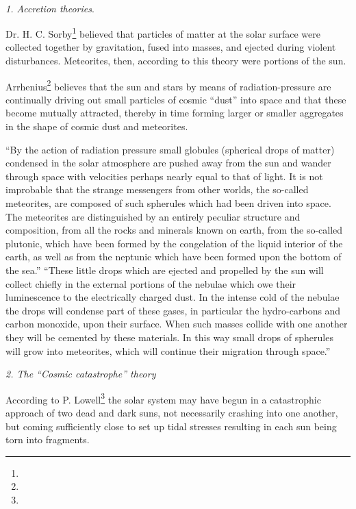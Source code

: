 \documentclass[a4paper, 12pt, oneside]{article}
\begin{document}
\paragraph{}
\centerline{\emph{1. Accretion theories}.}
Dr. H. C. Sorby\footnote{} believed that particles of matter at the solar surface were collected together by gravitation, fused into masses, and ejected during violent disturbances. Meteorites, then, according to this theory were portions of the sun.

Arrhenius\footnote{} believes that the sun and stars by means of radiation-pressure are continually driving out small particles of cosmic ``dust'' into space and that these become mutually attracted, thereby in time forming larger or smaller aggregates in the shape of cosmic dust and meteorites.

``By the action of radiation pressure small globules (spherical drops of matter) condensed in the solar atmosphere are pushed away from the sun and wander through space with velocities perhaps nearly equal to that of light. It is not improbable that the strange messengers from other worlds, the so-called meteorites, are composed of such spherules which had been driven into space. The meteorites are distinguished by an entirely peculiar structure and composition, from all the rocks and minerals known on earth, from the so-called plutonic, which have been formed by the congelation of the liquid interior of the earth, as well as from the neptunic which have been formed upon the bottom of the sea.'' ``These little drops which are ejected and propelled by the sun will collect chiefly in the external portions of the nebulae which owe their luminescence to the electrically charged dust. In the intense cold of the nebulae the drops will condense part of these gases, in particular the hydro-carbons and carbon monoxide, upon their surface. When such masses collide with one another they will be cemented by these materials. In this way small drops of spherules will grow into meteorites, which will continue their migration through space.''

\bigskip
\centerline{\emph{2. The ``Cosmic catastrophe'' theory}}

According to P. Lowell\footnote{} the solar system may have begun in a catastrophic approach of two dead and dark suns, not necessarily crashing into one another, but coming sufficiently close to set up tidal stresses resulting in each sun being torn into fragments.
\end{document}
